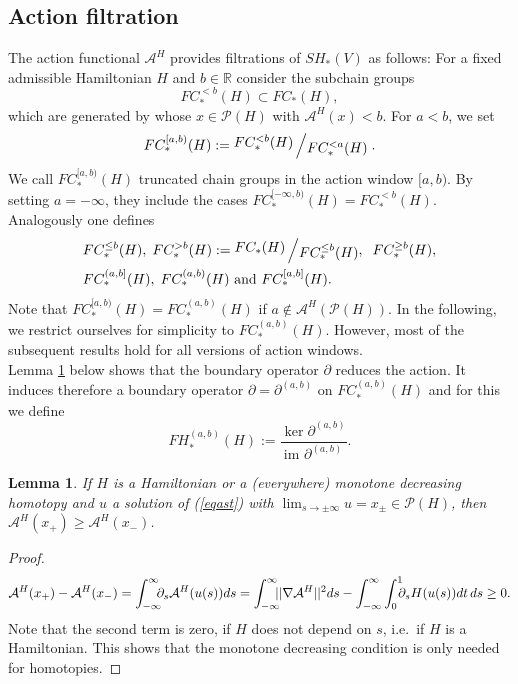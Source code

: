 \documentclass[a4paper,12pt,bibliography=totocnumbered,titlepage=false,abstracton,bookmarksnumbered=true]{scrartcl}
\newtheorem{lemme}[defn]{Lemma}
\theoremstyle{definition}
\begin{document}
\subsection{Action filtration}\label{sectrunc}
The action functional $\mathcal{A}^H$ provides filtrations of $SH_\ast(V)$ as follows: For a fixed admissible Hamiltonian $H$ and $b\in\mathbb{R}$ consider the subchain groups
\[FC_\ast^{<b}(H)\subset FC_\ast(H),\]
which are generated by whose $x\in\mathcal{P}(H)$ with $\mathcal{A}^H(x)<b$. For $a<b$, we set 
\[FC^{[a,b)}_\ast(H):=\raisebox{.2em}{$FC^{<b}_\ast(H)$}\left/\raisebox{-.2em}{$FC^{<a}_\ast(H)$}\right..\]
We call $FC^{[a,b)}_\ast(H)$ truncated chain groups in the action window $[a,b)$. By setting $a=-\infty$, they include the cases $FC_\ast^{[-\infty,b)}(H)=FC_\ast^{<b}(H)$.
Analogously one defines
\begin{align*}
 &FC_\ast^{\leq b}(H),\; FC^{>b}_\ast(H):=\raisebox{.2em}{$FC_\ast(H)$}\left/\raisebox{-.2em}{$FC^{\leq b}_\ast(H)$},\right.\; FC^{\geq b}_\ast(H),\\
 &FC^{(a,b]}_\ast(H),\;FC^{(a,b)}_\ast(H)\text{ and }FC^{[a,b]}_\ast(H).
\end{align*}
Note that $FC^{[a,b)}_\ast(H)=FC^{(a,b)}_\ast(H)$ if $a\not\in\mathcal{A}^H(\mathcal{P}(H))$. In the following, we restrict ourselves for simplicity to $FC^{(a,b)}_\ast(H)$. However, most of the subsequent results hold for all versions of action windows.\\
Lemma \ref{monolem} below shows that the boundary operator $\partial$ reduces the action. It induces therefore a boundary operator $\partial=\partial^{(a,b)}$ on $FC_\ast^{(a,b)}(H)$ and for this we define
\[FH_\ast^{(a,b)}(H):=\frac{\ker \partial^{(a,b)}}{\text{im } \partial^{(a,b)}}.\]
\begin{lemme}\label{monolem}
 If $H$ is a Hamiltonian or a (everywhere) monotone decreasing homotopy and $u$ a solution of (\ref{eqast}) with $\displaystyle\lim_{s\rightarrow\pm\infty}u=x_\pm\in\mathcal{P}(H)$, then $\mathcal{A}^H(x_+)\geq\mathcal{A}^H(x_-)$.
\end{lemme}
\begin{proof}
\[\mathcal{A}^H(x_+)-\mathcal{A}^H(x_-)=\int^\infty_{-\infty}\mspace{-10mu}\partial_s\mathcal{A}^H(u(s))ds=\int^\infty_{-\infty} \mspace{-10mu}||\nabla\mathcal{A}^H||^2ds-\int^\infty_{-\infty}\int^1_0 \mspace{-10mu}\partial_s  H(u(s))dt\,ds\geq 0.\]
 Note that the second term is zero, if $H$ does not depend on $s$, i.e.\ if $H$ is a Hamiltonian. This shows that the monotone decreasing condition is only needed for homotopies.
\end{proof}
\end{document}
